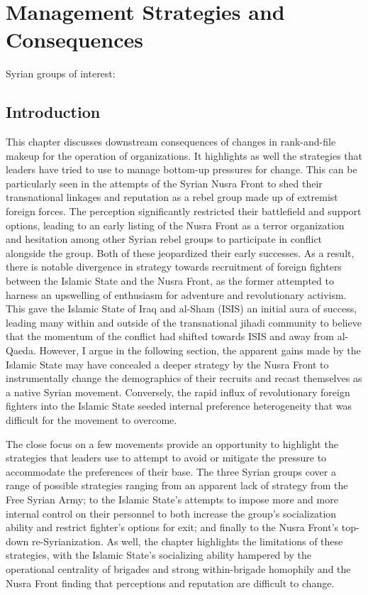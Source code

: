 \chapter{Management Strategies and Consequences}
\label{chapter :cases}


Syrian groups of interest:

\section{Introduction}

This chapter discusses downstream consequences of changes in rank-and-file makeup for the operation of organizations. It highlights as well the strategies that leaders have tried to use to manage bottom-up pressures for change. This can be particularly seen in the attempts of the Syrian Nusra Front to shed their transnational linkages and reputation as a rebel group made up of extremist foreign forces. The perception significantly restricted their battlefield and support options, leading to an early listing of the Nusra Front as a terror organization and hesitation among other Syrian rebel groups to participate in conflict alongside the group. Both of these jeopardized their early successes. As a result, there is notable divergence in strategy towards recruitment of foreign fighters between the Islamic State and the Nusra Front, as the former attempted to harness an upswelling of enthusiasm for adventure and revolutionary activism. This gave the Islamic State of Iraq and al-Sham (ISIS) an initial aura of success, leading many within and outside of the transnational jihadi community to believe that the momentum of the conflict had shifted towards ISIS and away from al-Qaeda. However, I argue in the following section, the apparent gains made by the Islamic State may have concealed a deeper strategy by the Nusra Front to instrumentally change the demographics of their recruits and recast themselves as a native Syrian movement. Conversely, the rapid influx of revolutionary foreign fighters into the Islamic State seeded internal preference heterogeneity that was difficult for the movement to overcome.  

The close focus on a few movements provide an opportunity to highlight the strategies that leaders use to attempt to avoid or mitigate the pressure to accommodate the preferences of their base. The three Syrian groups cover a range of possible strategies ranging from an apparent lack of strategy from the Free Syrian Army; to the Islamic State’s attempts to impose more and more internal control on their personnel to both increase the group’s socialization ability and restrict fighter’s options for exit; and finally to the Nusra Front’s top-down re-Syrianization. As well, the chapter highlights the limitations of these strategies, with the Islamic State’s socializing ability hampered by the operational centrality of brigades and strong within-brigade homophily and the Nusra Front finding that perceptions and reputation are difficult to change. 

